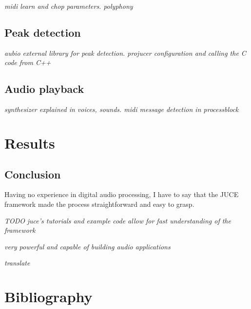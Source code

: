 \documentclass[12pt, a4paper, hidelinks]{article}
\begin{document}
	\textit{	midi learn and chop parameters. polyphony}
	
	
	\newpage
	\subsection{Peak detection}
	\textit{	aubio external library for peak detection. projucer configuration and calling the C code from C++}
	\par
	
	
	
	
	\newpage
	\subsection{Audio playback}
	\textit{	synthesizer explained in voices, sounds. midi message detection in processblock }
	\par
	
	
	
	
	\newpage
	\section{Results}
	
	
	


	\newpage
	\subsection{Conclusion}
	Having no experience in digital audio processing, I have to say that the JUCE framework made the process straightforward and easy to grasp.

\textit{TODO}
\textit{	juce's tutorials and example code allow for fast understanding of the framework}

\textit{	very powerful and capable of building audio applications}

\textit{translate}
	
		
	\newpage
	\section{Bibliography}
	\printbibliography
	
\end{document}
